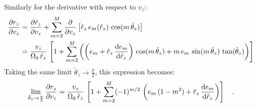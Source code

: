 \documentclass[modern]{aastex631}
\newcommand{\freqzero}{\ensuremath{\Omega_0}}
\newcommand{\mmax}{\ensuremath{M}}
\newcommand{\rz}{\ensuremath{r_z}}
\newcommand{\rzp}{\ensuremath{\tilde{r}_z}}
\newcommand{\thzp}{\ensuremath{\tilde{\theta}_z}}
\begin{document}
Similarly for the derivative with respect to $v_z$:
\begin{align}
    \pderiv{\rz}{v_z} &=
        \pderiv{\rzp}{v_z} +
        \sum_{m=2}^{\mmax} \frac{\partial}{\partial v_z}
            \left[\rzp \, e_m(\rzp) \, \cos(m \, \thzp)\right]\\
    &= \frac{v_z}{\freqzero \, \rzp} \, \left[
        1 + \sum_{m=2}^{\mmax} \left(
            \left(e_m + \rzp \, \deriv{e_m}{\rzp}\right) \,
                \cos(m \, \thzp) +
            m \, e_m \, \sin(m \, \thzp) \, \tan(\thzp)
        \right)
    \right]
\end{align}
Taking the same limit $\thzp \to \frac{\pi}{2}$, this expression becomes:
\begin{equation}
    \lim_{\thzp \to \frac{\pi}{2}} \frac{\partial \rz}{\partial v_z} =
        \frac{v_z}{\freqzero \, \rzp} \, \left[
            1 + \sum_{m=2}^{\mmax} (-1)^{m/2} \,
                \left(e_m\,(1 - m^2) + \rzp \, \deriv{e_m}{\rzp}\right)
        \right] \quad .
\end{equation}
\end{document}
